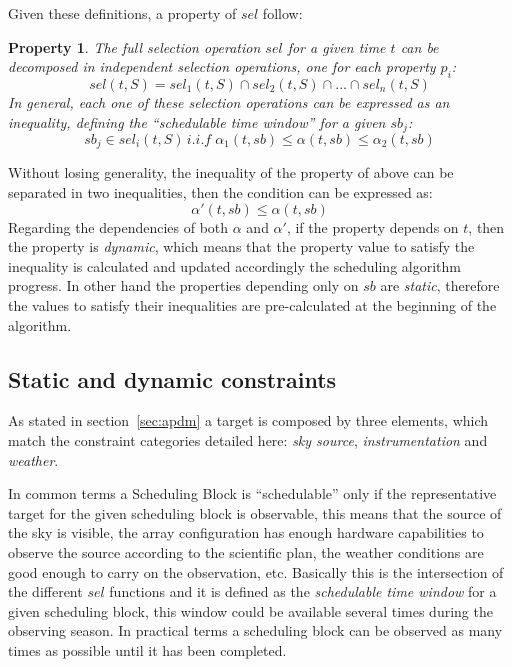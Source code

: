 Given these definitions, a property of $sel$ follow:

\newtheorem{sel-props}{Property}
\begin{sel-props}
The full selection operation $sel$ for a given time $t$ can be decomposed in independent selection operations, one for each property $p_i$:
$$sel(t,S) = sel_1(t, S) \cap sel_2(t, S) \cap ... \cap sel_n(t,S)$$
In general, each one of these selection operations can be expressed  as an inequality, defining the ``schedulable time window'' for a given $sb_j$:
$$sb_j \in sel_i(t, S)\,i.i.f\;\alpha_1(t, sb) \leq \alpha(t, sb) \leq \alpha_2(t, sb)$$
\end{sel-props}

Without losing generality, the inequality of the property of above can be separated in two inequalities, then the condition can be expressed as: 
$$\alpha'(t, sb) \leq \alpha (t, sb)$$
Regarding the dependencies of both $\alpha$ and $\alpha'$, if the property depends on $t$, then the property is \textit{dynamic}, which means that the property value to satisfy the inequality is calculated and updated accordingly the scheduling algorithm progress. In other hand the properties depending only on $sb$ are \textit{static}, therefore the values to satisfy their inequalities are pre-calculated at the beginning of the algorithm.\\

\subsection{Static and dynamic constraints}

As stated in section~\ref{sec:apdm} a target is composed by three elements, which match the constraint categories detailed here: \textit{sky source}, \textit{instrumentation} and \textit{weather}.

In common terms a Scheduling Block is ``schedulable'' only if the representative target for the given scheduling block is observable, this means that the source of the sky is visible, the array configuration has enough hardware capabilities to observe the source according to the scientific plan, the weather conditions are good enough to carry on the observation, etc. Basically this is the intersection of the different $sel$ functions and it is defined as the \textit{schedulable time window} for a given scheduling block, this window could be available several times during the observing season. In practical terms a scheduling block can be observed as many times as possible until it has been completed.

